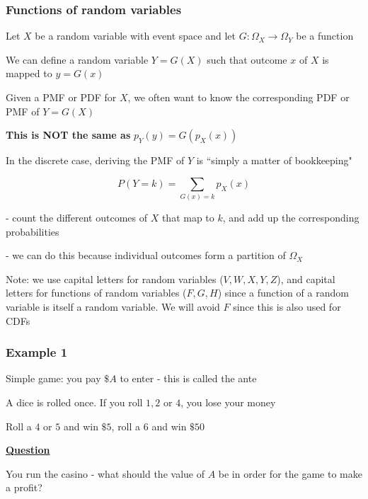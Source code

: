 \documentclass[t,8pt]{beamer}%
\begin{document}
\begin{frame}
\frametitle{Functions of random variables}
Let $X$ be a random variable with event space and let $G:\Omega_X\rightarrow\Omega_Y$ be a function \par
We can define a random variable $Y=G(X)$ such that outcome $x$ of $X$ is mapped to $y=G(x)$ \par
Given a PMF or PDF for $X$, we often want to know the corresponding PDF or PMF of $Y=G(X)$ \par
{\bf This is NOT the same as} $p_Y(y)=G(p_X(x))$ \par
In the discrete case, deriving the PMF of $Y$ is ``simply a matter of bookkeeping" \par
$$P(Y=k)=\sum_{G(x)=k}p_X(x)$$
{\small\color{NavyBlue} - count the different outcomes of $X$ that map to $k$, and add up the corresponding probabilities \par
- we can do this because individual outcomes form a partition of $\Omega_X$} \par
Note: we use capital letters for random variables ($V,W,X,Y,Z$), and capital letters for functions of random variables ($F,G,H$) since a function of a random variable is itself a random variable. We will avoid $F$ since this is also used for CDFs
\end{frame}

\begin{frame}
\frametitle{Example 1}
Simple game: you pay $\$A$ to enter - this is called the ante \par
A dice is rolled once. If you roll $1,2$ or $4$, you lose your money \par
Roll a $4$ or $5$ and win $\$5$, roll a $6$ and win $\$50$ \par
{\bf\underline{Question}} \par
You run the casino - what should the value of $A$ be in order for the game to make a profit?
\end{frame}
\end{document}
